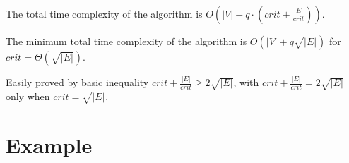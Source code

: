 \documentclass[12pt]{report}
\begin{document}
\begin{Corollary}
The total time complexity of the algorithm is $ O\left(\lvert V \rvert + q \cdot \left(\mathit{crit} + \frac{\lvert E \rvert}{\mathit{crit}} \right) \right) $.
\end{Corollary}

\begin{Theorem}
The minimum total time complexity of the algorithm is $ O\left(\lvert V \rvert + q \sqrt{\lvert E \rvert} \right) $ for $ \mathit{crit} = \Theta(\sqrt{\lvert E \rvert}) $.
\end{Theorem}
\begin{Proof}
Easily proved by basic inequality $ \mathit{crit} + \frac{\lvert E \rvert}{\mathit{crit}} \ge 2 \sqrt{\lvert E \rvert} $,
with $ \mathit{crit} + \frac{\lvert E \rvert}{\mathit{crit}} = 2 \sqrt{\lvert E \rvert} $ only when $ \mathit{crit} = \sqrt{\lvert E \rvert}. $
\end{Proof}

\pagebreak

\section{Example}
\end{document}
